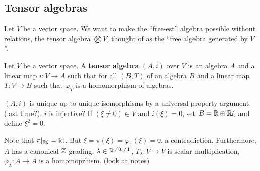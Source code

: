 \subsection{Tensor algebras}
Let $V$ be a vector space. We want to make the ``free-est'' algebra possible without relations, the tensor algebra $\bigotimes V$, thought of as the ``free algebra generated by $V$''.
\begin{definition}[]
    Let $V$ be a vector space. A \textbf{tensor algebra} $(A,i)$ over $V$ is an algebra $A$ and a linear map $i \colon V \to A$ such that for all $(B,T)$ of an algebra $B$ and a linear map $T \colon V \to B$ such that $\varphi _T$ is a homomorphism of algebras.
    \begin{figure}[H]
    \centering
    \end{figure}\end{definition}
$(A,i)$ is unique up to unique isomorphisms by a universal property argument (last time?). $i$ is injective? If $(\xi\neq 0) \in V$ and $i(\xi) =0$, set $B= \mathbb{R}\oplus \mathbb{R}\xi$ and define $\xi^2=0$.
\begin{figure}[H]
\centering
{}
\end{figure}
Note that $\pi|_{\mathbb{R}\xi}=\operatorname{id}$. But $\xi=\pi(\xi)=\varphi_1(\xi)=0 $, a contradiction. Furthermore, $A$ has a canonical $\mathbb{Z}$-grading. $\lambda \in \mathbb{R}^{\neq 0,\neq 1}$, $T_{\lambda}\colon V \to V$ is scalar multiplication, $\varphi _{\lambda}\colon A \to A$ is a homomoprhism. (look at notes)

